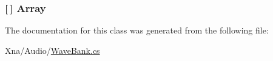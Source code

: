 \subsubsection[{Array}]{ \mbox{[}$\,$\mbox{]} Array\hspace{0.3cm}{\ttfamily [static]}}\label{classMicrosoft_1_1Xna_1_1Framework_1_1Audio_1_1WaveBank_a4de816c85e53231142e3a26cee0cd74b}


The documentation for this class was generated from the following file\+:\begin{DoxyCompactItemize}
\item 
Xna/\+Audio/\hyperlink{WaveBank_8cs}{Wave\+Bank.\+cs}\end{DoxyCompactItemize}
